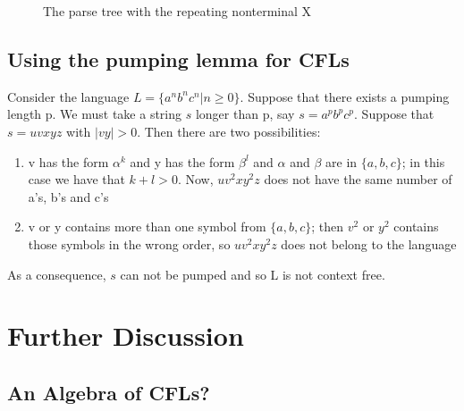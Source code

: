 \begin{figure}[h]
\caption{The parse tree with the repeating nonterminal
  X \label{parsetree2}}
\end{figure}


\subsection{Using the pumping lemma for CFLs}\label{voorbeeldpompcfl}

Consider the language $L = \{a^nb^nc^n | n \geq 0\}$. Suppose that
there exists a pumping length p. We must take a string $s$ longer than
p, say $s = a^pb^pc^p$.  Suppose that $s = uvxyz$ with $|vy| >
0$. Then there are two possibilities:
\begin{enumerate}
\item
v has the form $\alpha^k$ and y has the form $\beta^l$ and
$\alpha$ and $\beta$ are in $\{a,b,c\}$; in this case we have that
$k+l > 0$. Now, $uv^2xy^2z$ does not have the same number of a's, b's
and c's

\item
v or y contains more than one symbol from $\{a,b,c\}$; then $v^2$ or
$y^2$ contains those symbols in the wrong order, so $uv^2xy^2z$ does not belong to the language

\end{enumerate}

As a consequence, $s$ can not be pumped and so L is not context free.



\section{Further Discussion}

\subsection{An Algebra of CFLs?}

